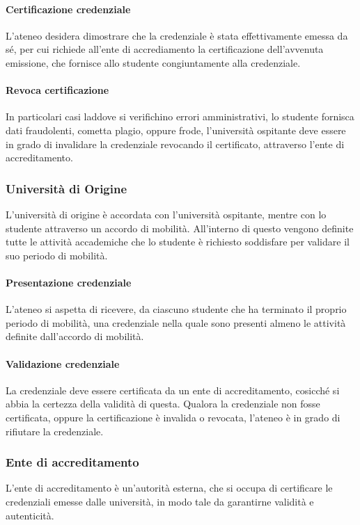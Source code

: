 \documentclass[a4paper,12pt]{article}
\begin{document}
\paragraph{Certificazione credenziale}  L'ateneo desidera dimostrare che la credenziale è stata effettivamente emessa da sé, per cui richiede all'ente di accrediamento la certificazione dell'avvenuta emissione, che fornisce allo studente congiuntamente alla credenziale.
\paragraph{Revoca certificazione} In particolari casi laddove si verifichino errori amministrativi, lo studente fornisca dati fraudolenti, cometta plagio, oppure frode, l'università ospitante deve essere in grado di invalidare la credenziale revocando il certificato, attraverso l'ente di accreditamento.

\subsubsection{Università di Origine}
L'università di origine è accordata con l'università ospitante, mentre con lo studente attraverso un accordo di mobilità. All'interno di questo vengono definite tutte le attività accademiche che lo studente è richiesto soddisfare per validare il suo periodo di mobilità.
\paragraph{Presentazione credenziale} L'ateneo si aspetta di ricevere, da ciascuno studente che ha terminato il proprio periodo di mobilità, una credenziale nella quale sono presenti almeno le attività definite dall'accordo di mobilità.
\paragraph{Validazione credenziale} La credenziale deve essere certificata da un ente di accreditamento, cosicché si abbia la certezza della validità di questa. Qualora la credenziale non fosse certificata, oppure la certificazione è invalida o revocata, l'ateneo è in grado di rifiutare la credenziale.
\subsubsection{Ente di accreditamento}
L'ente di accreditamento è un'autorità esterna, che si occupa di certificare le credenziali emesse dalle università, in modo tale da garantirne validità e autenticità. 
\end{document}
